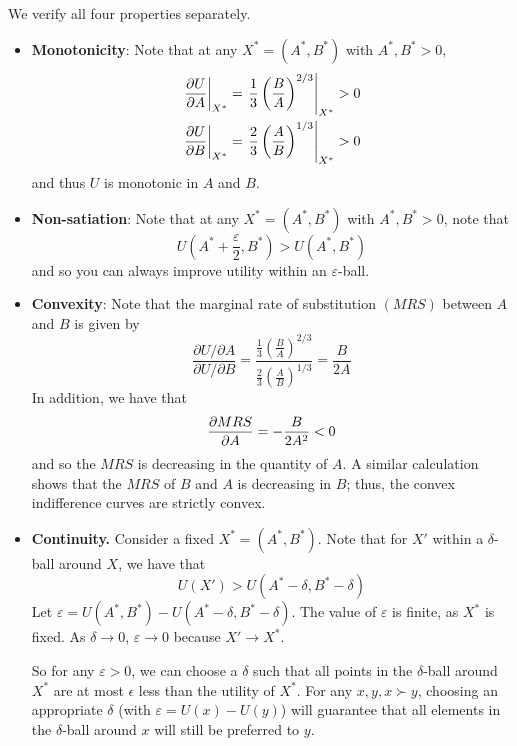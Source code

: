\documentclass[answers, reflections]{padajar-pset}
\begin{document}
\begin{questions}
\begin{parts}
	\begin{solution}
		We verify all four properties separately.
		\begin{itemize}
			\item \textbf{Monotonicity}: Note that at any $X^* = (A^*, B^*)$ with $A^*,B^* > 0$,
			\begin{align*}
				\left.\pdv{U}{A}\right|_{X^*} &= \left. \frac13 \left(\frac{B}{A}\right)^{2/3}\right|_{X^*} > 0 \\
				\left.\pdv{U}{B}\right|_{X^*} &= \left. \frac23 \left(\frac{A}{B}\right)^{1/3}\right|_{X^*} > 0
			\end{align*}
			and thus $U$ is monotonic in $A$ and $B$.
			\item \textbf{Non-satiation}: Note that at any $X^* = (A^*, B^*)$ with $A^*,B^* > 0$, note that
			\[
			U\left(A^* + \frac{\varepsilon}{2}, B^*\right) > U(A^*, B^*)
			\]
			and so you can always improve utility within an $\varepsilon$-ball.
			\item \textbf{Convexity}: Note that the marginal rate of substitution $(MRS)$ between $A$ and $B$ is given by
			\[
			\frac{\partial U / \partial A}{\partial U / \partial B 	}= \frac{\frac13 \left( \frac{B}{A}\right)^{2/3}}{\frac23 \left(\frac{A}{B}\right)^{1/3}} = \frac{B}{2A}
			\]
			In addition, we have that
			\[
			\pdv{MRS}{A} = -\frac{B}{2A^2} < 0
			\]
			and so the $MRS$ is decreasing in the quantity of $A$. A similar calculation shows that the $MRS$ of $B$ and $A$ is decreasing in $B$; thus, the convex indifference curves are strictly convex.
			\item \textbf{Continuity.} Consider a fixed $X^* = (A^*, B^*)$. Note that for $X'$ within a $\delta$-ball around $X$, we have that
			\[
			U(X') > U(A^* - \delta, B^* - \delta)
			\]
			Let $\varepsilon = U(A^*, B^*) - U(A^* - \delta, B^* - \delta)$. The value of $\varepsilon$ is finite, as $X^*$ is fixed. As $\delta \rightarrow 0$, $\varepsilon \rightarrow 0$ because $X' \rightarrow X^*$.

			So for any $\varepsilon > 0$, we can choose a $\delta$ such that all points in the $\delta$-ball around $X^*$ are at most $\epsilon$ less than the utility of $X^*$. For any $x, y, x \succ y$, choosing an appropriate $\delta$ (with $\varepsilon = U(x) - U(y)$) will guarantee that all elements in the $\delta$-ball around $x$ will still be preferred to $y$.
		\end{itemize}
	\end{solution}
	\begin{reflection}
		\lipsum[1]
	\end{reflection}


\end{parts}
\end{questions}
\end{document}

